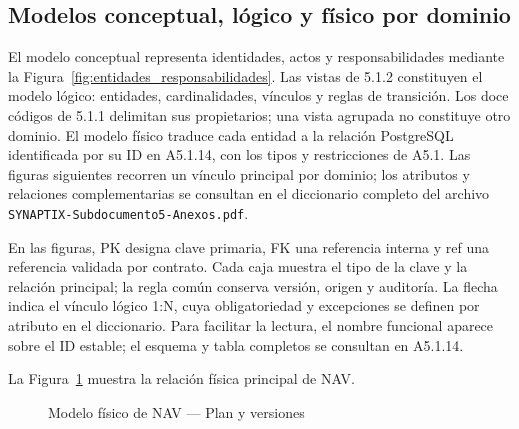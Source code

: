 \subsection{Modelos conceptual, lógico y físico por dominio}
El modelo conceptual representa identidades, actos y responsabilidades mediante la Figura~\ref{fig:entidades_responsabilidades}. Las vistas de 5.1.2 constituyen el modelo lógico: entidades, cardinalidades, vínculos y reglas de transición. Los doce códigos de 5.1.1 delimitan sus propietarios; una vista agrupada no constituye otro dominio. El modelo físico traduce cada entidad a la relación PostgreSQL identificada por su ID en A5.1.14, con los tipos y restricciones de A5.1. Las figuras siguientes recorren un vínculo principal por dominio; los atributos y relaciones complementarias se consultan en el diccionario completo del archivo \texttt{SYNAPTIX-Subdocumento5-Anexos.pdf}.

En las figuras, PK designa clave primaria, FK una referencia interna y ref una referencia validada por contrato. Cada caja muestra el tipo de la clave y la relación principal; la regla común conserva versión, origen y auditoría. La flecha indica el vínculo lógico 1:N, cuya obligatoriedad y excepciones se definen por atributo en el diccionario. Para facilitar la lectura, el nombre funcional aparece sobre el ID estable; el esquema y tabla completos se consultan en A5.1.14.

La Figura~\ref{fig:sd5_fisico_nav} muestra la relación física principal de NAV.

\begin{figure}[htbp]
\centering
{}
\caption{Modelo físico de NAV — Plan y versiones}\label{fig:sd5_fisico_nav}
\end{figure}

